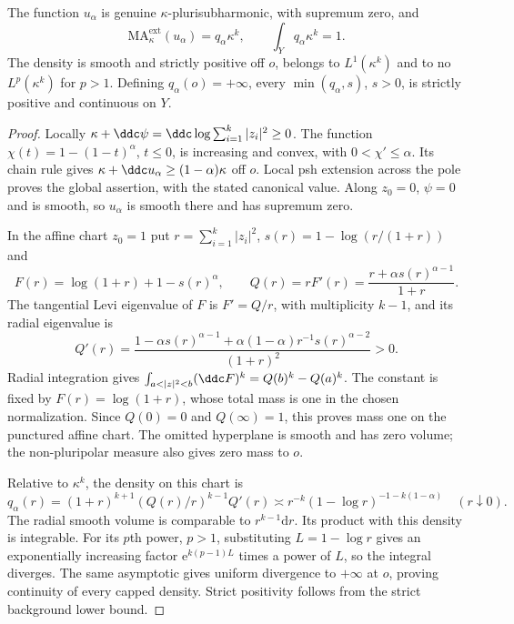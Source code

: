 \begin{lemma}\label{lem:projective-sublogarithmic-density}
The function $u_\alpha$ is genuine $\kappa$-plurisubharmonic, with supremum zero, and
\[
 \mathrm{MA}^{\mathrm{ext}}_\kappa(u_\alpha)=q_\alpha\kappa^k,
 \qquad \int_Yq_\alpha\kappa^k=1.
\]
The density is smooth and strictly positive off $o$, belongs to $L^1(\kappa^k)$ and to no $L^p(\kappa^k)$ for $p>1$. Defining $q_\alpha(o)=+\infty$, every $\min(q_\alpha,s)$, $s>0$, is strictly positive and continuous on $Y$.
\end{lemma}
\begin{proof}
Locally $\kappa+\ddc\psi=\ddc\log\sum_{i=1}^k|z_i|^2\geq0$. The function $\chi(t)=1-(1-t)^\alpha$, $t\leq0$, is increasing and convex, with $0<\chi'\leq\alpha$. Its chain rule gives $\kappa+\ddc u_\alpha\geq(1-\alpha)\kappa$ off $o$. Local psh extension across the pole proves the global assertion, with the stated canonical value. Along $z_0=0$, $\psi=0$ and is smooth, so $u_\alpha$ is smooth there and has supremum zero.

In the affine chart $z_0=1$ put $r=\sum_{i=1}^k|z_i|^2$, $s(r)=1-\log(r/(1+r))$ and
\[
 F(r)=\log(1+r)+1-s(r)^\alpha,\qquad
 Q(r)=rF'(r)=\frac{r+\alpha s(r)^{\alpha-1}}{1+r}.
\]
The tangential Levi eigenvalue of $F$ is $F'=Q/r$, with multiplicity $k-1$, and its radial eigenvalue is
\[
 Q'(r)=\frac{1-\alpha s(r)^{\alpha-1}+\alpha(1-\alpha)r^{-1}s(r)^{\alpha-2}}{(1+r)^2}>0.
\]
Radial integration gives $\int_{a<|z|^2<b}(\ddc F)^k=Q(b)^k-Q(a)^k$. The constant is fixed by $F(r)=\log(1+r)$, whose total mass is one in the chosen normalization. Since $Q(0)=0$ and $Q(\infty)=1$, this proves mass one on the punctured affine chart. The omitted hyperplane is smooth and has zero volume; the non-pluripolar measure also gives zero mass to $o$.

Relative to $\kappa^k$, the density on this chart is
\[
 q_\alpha(r)=(1+r)^{k+1}(Q(r)/r)^{k-1}Q'(r)
 \asymp r^{-k}(1-\log r)^{-1-k(1-\alpha)}\quad(r\downarrow0).
\]
The radial smooth volume is comparable to $r^{k-1}\mathrm{d}r$. Its product with this density is integrable. For its $p$th power, $p>1$, substituting $L=1-\log r$ gives an exponentially increasing factor $\mathrm{e}^{k(p-1)L}$ times a power of $L$, so the integral diverges. The same asymptotic gives uniform divergence to $+\infty$ at $o$, proving continuity of every capped density. Strict positivity follows from the strict background lower bound.
\end{proof}

